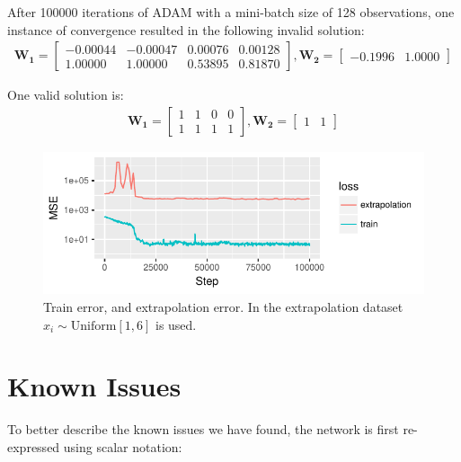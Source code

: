 \documentclass[a4paper]{article}
\begin{document}
After 100000 iterations of ADAM with a mini-batch size of 128 observations, one instance of convergence resulted in the following invalid solution: 
\begin{equation*}
\begin{aligned}
\mathbf{W_1} = \begin{bmatrix}
-0.00044 & -0.00047 & 0.00076 & 0.00128 \\
1.00000 & 1.00000 & 0.53895 & 0.81870
\end{bmatrix},
\mathbf{W_2} = \begin{bmatrix}
-0.1996 & 1.0000
\end{bmatrix}
\end{aligned}
\end{equation*}

One valid solution is:
\begin{equation*}
\begin{aligned}
\mathbf{W_1} = \begin{bmatrix}
1 & 1 & 0 & 0 \\
1 & 1 & 1 & 1
\end{bmatrix}, 
\mathbf{W_2} = \begin{bmatrix}
1 & 1
\end{bmatrix}
\end{aligned}
\end{equation*}

\begin{figure}[H]
	\centering
	\includegraphics[]{./graphics/nac-mul-normal-learning}
	\caption{Train error, and extrapolation error. In the extrapolation dataset $x_i \sim \mathrm{Uniform}[1, 6]$ is used.}
\end{figure}

\section{Known Issues}

To better describe the known issues we have found, the network is first re-expressed using scalar notation:
\end{document}
